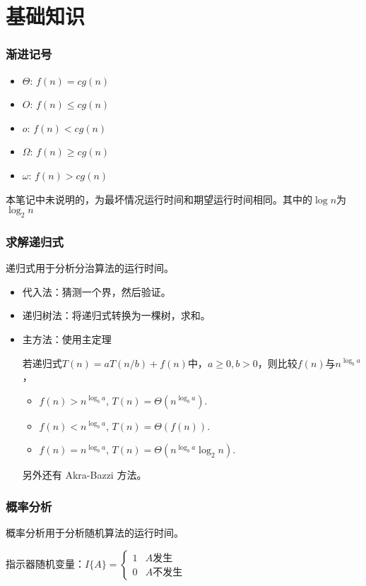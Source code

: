 \section{基础知识}
\subsubsection*{渐进记号}
\begin{itemize}
    \item $\Theta$: $f(n) = cg(n)$
    \item $O$: $f(n) \le cg(n)$
    \item $o$: $f(n) < cg(n)$
    \item $\Omega$: $f(n) \ge cg(n)$
    \item $\omega$: $f(n) > cg(n)$
\end{itemize}
本笔记中未说明的，为最坏情况运行时间和期望运行时间相同。其中的$\log n$为$\log _2 n$

\subsubsection*{求解递归式}
递归式用于分析分治算法的运行时间。
\begin{itemize}
    \item 代入法：猜测一个界，然后验证。
    \item 递归树法：将递归式转换为一棵树，求和。
    \item 主方法：使用主定理

    若递归式$T(n) = aT(n/b) + f(n)$中，$a \ge 0, b > 0$，则比较$f(n)$与$n^{\log _b a}$，
    \begin{itemize}
        \item $f(n) > n^{\log _b a}$, $T(n) = \Theta (n^{\log _b a})$.
        \item $f(n) < n^{\log _b a}$, $T(n) = \Theta (f(n))$.
        \item $f(n) = n^{\log _b a}$, $T(n) = \Theta (n^{\log _b a} \log _2 n)$.
    \end{itemize}

    另外还有 Akra-Bazzi 方法。
\end{itemize}

\subsubsection*{概率分析}
概率分析用于分析随机算法的运行时间。

指示器随机变量：$I\{A\} = \begin{cases} 1 & A \text{发生}\\ 0 & A \text{不发生} \end{cases}$

